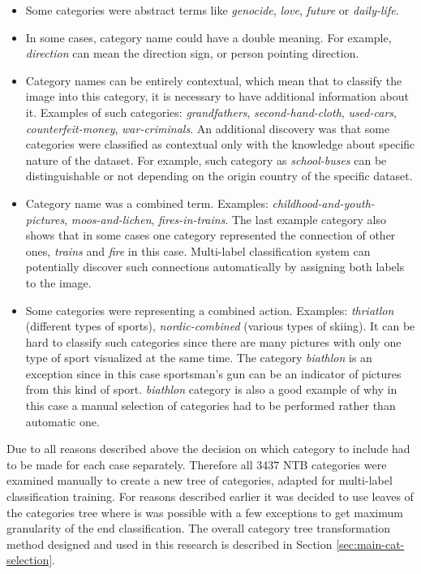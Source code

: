     \begin{itemize}
        \item Some categories were abstract terms like \textit{genocide}, \textit{love}, \textit{future} or \textit{daily-life}.
        \item In some cases, category name could have a double meaning. For example, \textit{direction} can mean the direction sign, or person pointing direction.
        \item Category names can be entirely contextual, which mean that to classify the image into this category, it is necessary to have additional information about it. Examples of such categories: \textit{grandfathers}, \textit{second-hand-cloth}, \textit{used-cars}, \textit{counterfeit-money}, \textit{war-criminals}. An additional discovery was that some categories were classified as contextual only with the knowledge about specific nature of the dataset. For example, such category as \textit{school-buses} can be distinguishable or not depending on the origin country of the specific dataset.
        \item Category name was a combined term. Examples: \textit{childhood-and-youth-pictures}, \textit{moos-and-lichen}, \textit{fires-in-trains}. The last example category also shows that in some cases one category represented the connection of other ones, \textit{trains} and \textit{fire} in this case. Multi-label classification system can potentially discover such connections automatically by assigning both labels to the image.
        \item Some categories were representing a combined action. Examples: \textit{thriatlon} (different types of sports), \textit{nordic-combined} (various types of skiing). It can be hard to classify such categories since there are many pictures with only one type of sport visualized at the same time. The category \textit{biathlon} is an exception since in this case sportsman's gun can be an indicator of pictures from this kind of sport. \textit{biathlon} category is also a good example of why in this case a manual selection of categories had to be performed rather than automatic one.
    \end{itemize}
    
    Due to all reasons described above the decision on which category to include had to be made for each case separately. Therefore all 3437 NTB categories were examined manually to create a new tree of categories, adapted for multi-label classification training. For reasons described earlier it was decided to use leaves of the categories tree where is was possible with a few exceptions to get maximum granularity of the end classification. The overall category tree transformation method designed and used in this research is described in Section \ref{sec:main-cat-selection}.
    
